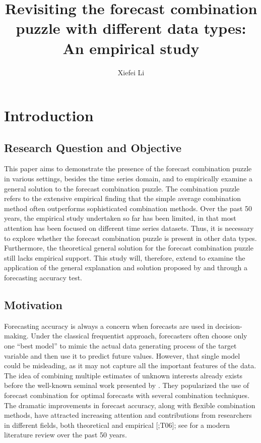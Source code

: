 \documentclass{monashthesis}
\author{Xiefei Li}
\title{Revisiting the forecast combination puzzle with different data types: An empirical study}
\begin{document}

\titlepage

{\sf\tighttoc\doublespacing}

\clearpage{}\setcounter{page}{1}

\hypertarget{introduction}{%
\chapter{Introduction}\label{introduction}}

\hypertarget{research-question-and-objective}{%
\section{Research Question and Objective}\label{research-question-and-objective}}

This paper aims to demonstrate the presence of the forecast combination puzzle in various settings, besides the time series domain, and to empirically examine a general solution to the forecast combination puzzle. The combination puzzle refers to the extensive empirical finding that the simple average combination method often outperforms sophisticated combination methods. Over the past 50 years, the empirical study undertaken so far has been limited, in that most attention has been focused on different time series datasets. Thus, it is necessary to explore whether the forecast combination puzzle is present in other data types. Furthermore, the theoretical general solution for the forecast combination puzzle still lacks empirical support. This study will, therefore, extend to examine the application of the general explanation and solution proposed by \textcite{ZMFP22} and \textcite{FZMP23} through a forecasting accuracy test.

\hypertarget{motivation}{%
\section{Motivation}\label{motivation}}

Forecasting accuracy is always a concern when forecasts are used in decision-making. Under the classical frequentist approach, forecasters often choose only one ``best model'' to mimic the actual data generating process of the target variable and then use it to predict future values. However, that single model could be misleading, as it may not capture all the important features of the data. The idea of combining multiple estimates of unknown interests already exists before the well-known seminal work presented by \textcite{BG69}. They popularized the use of forecast combination for optimal forecasts with several combination techniques. The dramatic improvements in forecast accuracy, along with flexible combination methods, have attracted increasing attention and contributions from researchers in different fields, both theoretical and empirical {[}\textcite{C89};T06{]}; see \textcite{WHLK22} for a modern literature review over the past 50 years.
\end{document}
